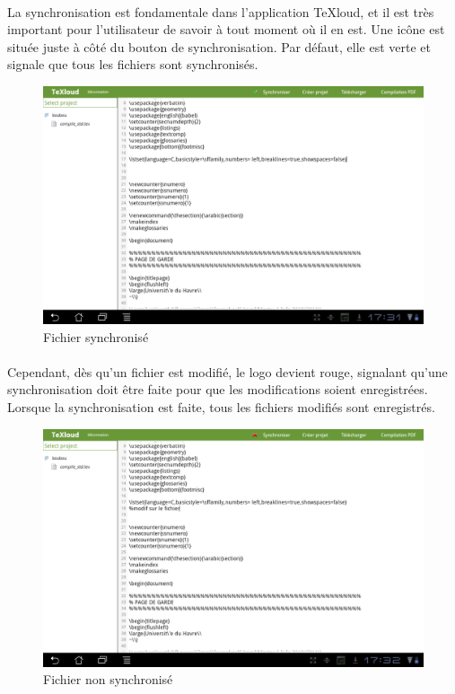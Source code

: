 \documentclass[a4paper,12pt]{article}
\begin{document}
\paragraph*{}
La synchronisation est fondamentale dans l'application TeXloud, et il est très important pour l'utilisateur de savoir à tout moment où il en est. Une icône est située juste à côté du bouton de synchronisation. Par défaut, elle est verte et signale que tous les fichiers sont synchronisés.
\begin{figure}[!ht]
\begin{center}
  \includegraphics[width=1\textwidth]{./images/screenshot/synchro1_android.png}
\end{center}
  \caption{Fichier synchronisé}
  \label{Fichier synchronisé}
\end{figure}

\paragraph*{}
Cependant, dès qu'un fichier est modifié, le logo devient rouge, signalant qu'une synchronisation doit être faite pour que les modifications soient enregistrées. Lorsque la synchronisation est faite, tous les fichiers modifiés sont enregistrés.
\begin{figure}[!ht]
\begin{center}
  \includegraphics[width=1\textwidth]{./images/screenshot/synchro2_android.png}
\end{center}
  \caption{Fichier non synchronisé}
  \label{Fichier non synchronisé}
\end{figure}
\end{document}
